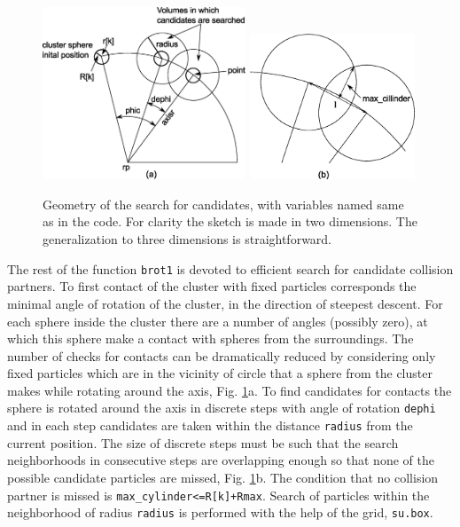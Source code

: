 \documentclass[12pt]{article}
\begin{document}
\begin{figure}[!htbh]
\begin{center}
\includegraphics[width=0.54\textwidth]{drawing_optimization_final_a.eps}
\includegraphics[width=0.44\textwidth]{drawing_optimization_final_b.eps}
\caption{Geometry of the search for candidates, with variables named same as in the code. For clarity the sketch is made in two dimensions. The generalization to three dimensions is straightforward.}
\label{optim}
\end{center}
\end{figure}


The rest of the function \texttt{brot1} is devoted to efficient search for candidate collision partners. To first contact of the cluster with fixed particles corresponds the minimal angle of rotation of the cluster, in the direction of steepest descent. For each sphere inside the cluster there are a number of angles (possibly zero), at which this sphere make a contact with spheres from the surroundings. The number of checks for contacts can be dramatically reduced by considering only fixed particles which are in the vicinity of circle that a sphere from the cluster makes while rotating around the axis, Fig. \ref{optim}a. To find candidates for contacts the sphere is rotated around the axis in discrete steps with angle of rotation \texttt{dephi} and in each step candidates are taken within the distance \texttt{radius} from the current position. The size of discrete steps must be such that the search neighborhoods in consecutive steps are overlapping enough so that none of the possible candidate particles are missed, Fig. \ref{optim}b.  The condition that no collision partner is missed is \texttt{max\_cylinder<=R[k]+Rmax}. Search of particles within the neighborhood of radius \texttt{radius} is performed with the help of the grid, \texttt{su.box}.
\end{document}
